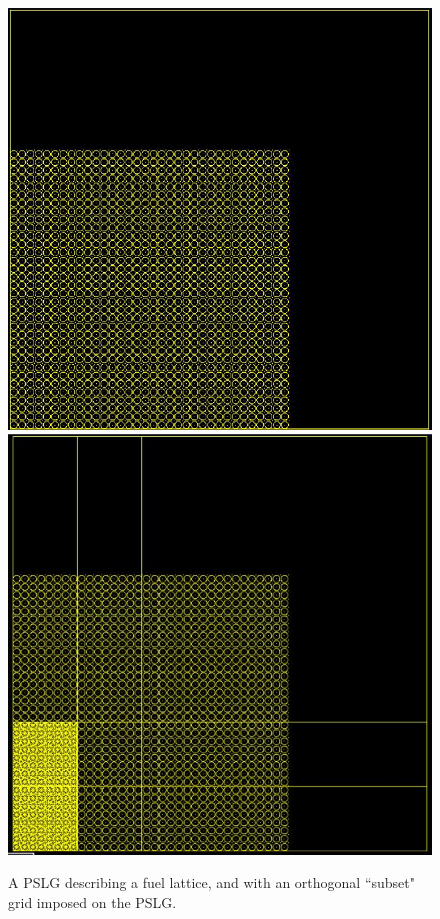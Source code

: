 \documentclass{anstrans}
\begin{document}
\begin{figure}[H]
\centering
\includegraphics[scale = 0.45]{figures/lattice.png}
\includegraphics[scale = 0.45]{figures/subsetlattice.png}
\caption{A PSLG describing a fuel lattice, and with an orthogonal ``subset" grid imposed on the PSLG.}
\label{grid}
\end{figure}
\end{document}
